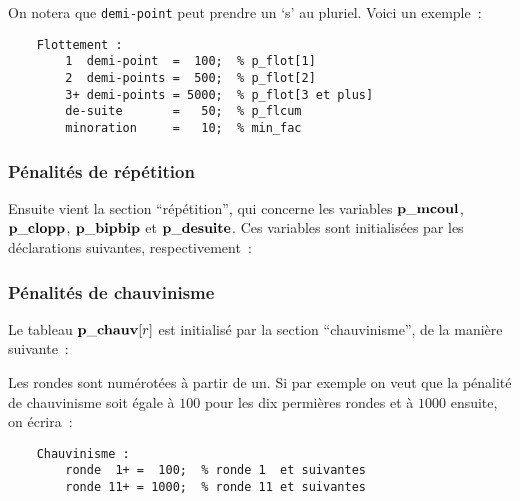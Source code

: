\documentclass[10pt]{article}
\begin{document}
\noindent On notera que \verb|demi-point| peut prendre un `s' au pluriel.
Voici un exemple~:
\begin{verbatim}
    Flottement :
        1  demi-point  =  100;  % p_flot[1]
        2  demi-points =  500;  % p_flot[2]
        3+ demi-points = 5000;  % p_flot[3 et plus]
        de-suite       =   50;  % p_flcum
        minoration     =   10;  % min_fac
\end{verbatim}

\subsubsection{Pénalités de répétition}

Ensuite vient la section ``répétition'', qui concerne les variables
$\bf p\_mcoul$, $\bf p\_clopp$, $\bf p\_bipbip$ et $\bf p\_desuite$. Ces
variables sont initialisées par les déclara\-tions suivantes,
respectivement~:

\medbreak
{}
\medbreak

\subsubsection{Pénalités de chauvinisme}

Le tableau ${\bf p\_chauv}[r]$ est initialisé par la section
``chauvinisme'', de la manière suivante~:

\medbreak
{}
\medbreak

Les rondes sont numérotées à partir de un. Si par exemple on veut
que la pénalité de chauvinisme soit égale à $100$ pour les dix
permières rondes et à $1000$ ensuite, on écrira~:
\begin{verbatim}
    Chauvinisme :
        ronde  1+ =  100;  % ronde 1  et suivantes
        ronde 11+ = 1000;  % ronde 11 et suivantes
\end{verbatim}
\end{document}
